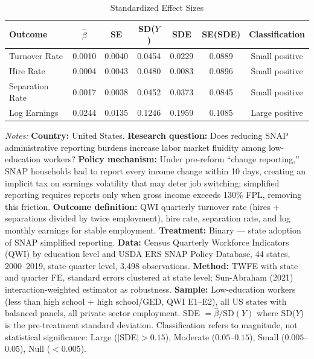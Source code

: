 \begin{table}[htbp]
\centering
\caption{Standardized Effect Sizes}
\label{tab:sde}
\begin{tabular}{lcccccc}
\toprule
Outcome & $\hat{\beta}$ & SE & SD($Y$) & SDE & SE(SDE) & Classification \\
\midrule
Turnover Rate & 0.0010 & 0.0040 & 0.0454 & 0.0229 & 0.0889 & Small positive \\
Hire Rate & 0.0004 & 0.0043 & 0.0480 & 0.0083 & 0.0896 & Small positive \\
Separation Rate & 0.0017 & 0.0038 & 0.0452 & 0.0373 & 0.0845 & Small positive \\
Log Earnings & 0.0244 & 0.0135 & 0.1246 & 0.1959 & 0.1085 & Large positive \\
\bottomrule
\end{tabular}
\begin{tablenotes}[flushleft]
\small
\item \textit{Notes:} \textbf{Country:} United States. \textbf{Research question:} Does reducing SNAP administrative reporting burdens increase labor market fluidity among low-education workers? \textbf{Policy mechanism:} Under pre-reform ``change reporting,'' SNAP households had to report every income change within 10 days, creating an implicit tax on earnings volatility that may deter job switching; simplified reporting requires reports only when gross income exceeds 130\% FPL, removing this friction. \textbf{Outcome definition:} QWI quarterly turnover rate (hires + separations divided by twice employment), hire rate, separation rate, and log monthly earnings for stable employment. \textbf{Treatment:} Binary --- state adoption of SNAP simplified reporting. \textbf{Data:} Census Quarterly Workforce Indicators (QWI) by education level and USDA ERS SNAP Policy Database, 44 states, 2000--2019, state-quarter level, 3,498 observations. \textbf{Method:} TWFE with state and quarter FE, standard errors clustered at state level; Sun-Abraham (2021) interaction-weighted estimator as robustness. \textbf{Sample:} Low-education workers (less than high school + high school/GED, QWI E1--E2), all US states with balanced panels, all private sector employment. SDE $= \hat{\beta} / \text{SD}(Y)$ where SD($Y$) is the pre-treatment standard deviation. Classification refers to magnitude, not statistical significance: Large ($|$SDE$| > 0.15$), Moderate ($0.05$--$0.15$), Small ($0.005$--$0.05$), Null ($< 0.005$). 
\end{tablenotes}
\end{table}

